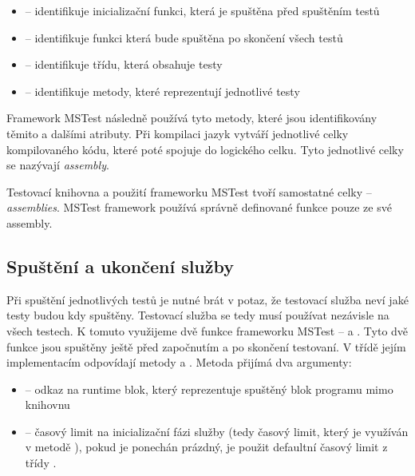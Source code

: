 \begin{itemize}
    \item {} -- identifikuje inicializační funkci, která je spuštěna před spuštěním testů \cite{attr_init_clean}
    \item {} -- identifikuje funkci která bude spuštěna po skončení všech testů \cite{attr_init_clean}
    \item {} -- identifikuje třídu, která obsahuje testy \cite{mstest_docs}
    \item {} -- identifikuje metody, které reprezentují jednotlivé  testy \cite{mstest_docs}
\end{itemize}

Framework MSTest následně používá tyto metody, které jsou identifikovány těmito a dalšími atributy. Při kompilaci jazyk \csharp{} vytváří jednotlivé celky kompilovaného kódu, které poté spojuje do logického celku. Tyto jednotlivé celky se nazývají \textit{assembly}. \cite{assembly}

Testovací knihovna a použití frameworku MSTest tvoří samostatné celky -- \textit{assemblies}. MSTest framework používá správně definované funkce pouze ze své assembly. 


\subsection{Spuštění a ukončení služby}

Při spuštění jednotlivých testů je nutné brát v potaz, že testovací služba neví jaké testy budou kdy spuštěny. Testovací služba se tedy musí používat nezávisle na všech testech. K tomuto využijeme dvě funkce frameworku MSTest --  a . Tyto dvě funkce jsou spuštěny ještě před započnutím a po skončení testovaní. V třídě  jejím implementacím odpovídají metody  a . Metoda  přijímá dva argumenty:

\begin{itemize}
    \item {} -- odkaz na runtime blok, který reprezentuje spuštěný blok programu mimo knihovnu
    \item {} -- časový limit na inicializační fázi služby (tedy časový limit, který je využíván v metodě ), pokud je ponechán prázdný, je použit defaultní časový limit z třídy .
\end{itemize}

